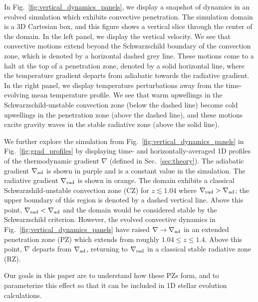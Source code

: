 \documentclass[twocolumn]{aastex631}
\newcommand{\gradrad}{\ensuremath{\nabla_{\rm{rad}}}}
\newcommand{\gradad}{\ensuremath{\nabla_{\rm{ad}}}}
\newcommand{\justgrad}{\ensuremath{\nabla}}
\begin{document}
In Fig.~\ref{fig:vertical_dynamics_panels}, we display a snapshot of dynamics in an evolved simulation which exhibits convective penetration.
The simulation domain is a 3D Cartesian box, and this figure shows a vertical slice through the center of the domain.
In the left panel, we display the vertical velocity.
We see that convective motions extend beyond the Schwarzschild boundary of the convection zone, which is denoted by a horizontal dashed grey line.
These motions come to a halt at the top of a penetration zone, denoted by a solid horizontal line, where the temperature gradient departs from adiabatic towards the radiative gradient.
In the right panel, we display temperature perturbations away from the time-evolving mean temperature profile.
We see that warm upwellings in the Schwarzschild-unstable convection zone (below the dashed line) become cold upwellings in the penetration zone (above the dashed line), and these motions excite gravity waves in the stable radiative zone (above the solid line).

We further explore the simulation from Fig.~\ref{fig:vertical_dynamics_panels} in Fig.~\ref{fig:grad_profiles} by displaying time- and horizontally-averaged 1D profiles of the thermodynamic gradient $\justgrad$ (defined in Sec.~\ref{sec:theory}).
The adiabatic gradient $\gradad$ is shown in purple and is a constant value in the simulation.
The radiative gradient $\gradrad$ is shown in orange.
The domain exhibits a classical Schwarzshild-unstable convection zone (CZ) for $z \lesssim 1.04$ where $\gradrad > \gradad$; the upper boundary of this region is denoted by a dashed vertical line.
Above this point, $\gradrad < \gradad$ and the domain would be considered stable by the Schwarzschild criterion.
However, the evolved convective dynamics in Fig.~\ref{fig:vertical_dynamics_panels} have raised $\justgrad \rightarrow \gradad$ in an extended penetration zone (PZ) which extends from roughly $1.04 \leq z \leq 1.4$.
Above this point, $\justgrad$ departs from $\gradad$, returning to $\gradrad$ in a classical stable radiative zone (RZ).

Our goals in this paper are to understand how these PZs form, and to parameterize this effect so that it can be included in 1D stellar evolution calculations.
\end{document}
